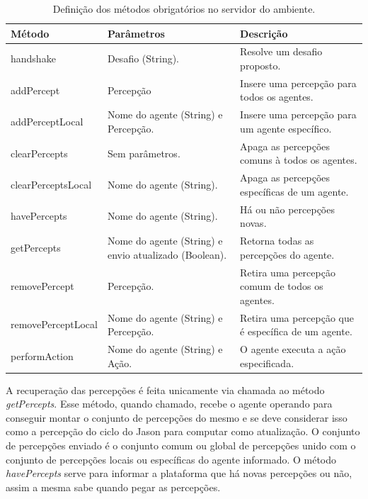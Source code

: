 \begin{table}
	\caption{Definição dos métodos obrigatórios no servidor do ambiente.}
	\label{table-server-environment}
	\begin{center}
	\begin{tabular}{|p{34mm}|p{50mm}|p{50mm}|} %
		\hline
		Método & Parâmetros & Descrição \\ \hline
		handshake & Desafio (String). & Resolve um desafio proposto. \\ \hline
		addPercept & Percepção & Insere uma percepção para todos os agentes.\\ \hline
		addPerceptLocal & Nome do agente (String) e Percepção. & Insere uma percepção para um agente específico. \\ \hline
		clearPercepts & Sem parâmetros. & Apaga as percepções comuns à todos os agentes.\\ \hline
		clearPerceptsLocal & Nome do agente (String). & Apaga as percepções específicas de um agente.\\ \hline
		havePercepts & Nome do agente (String). & Há ou não percepções novas. \\ \hline
		getPercepts &  Nome do agente (String) e envio atualizado (Boolean). & Retorna todas as percepções do agente. \\ \hline
		removePercept & Percepção. & Retira uma percepção comum de todos os agentes. \\ \hline
		removePerceptLocal & Nome do agente (String) e Percepção. & Retira uma percepção que é específica de um agente. \\ \hline
		performAction & Nome do agente (String) e Ação. & O agente executa a ação especificada. \\ \hline
	\end{tabular}
	\end{center}
\end{table}

A recuperação das percepções é feita unicamente via chamada ao método
\emph{getPercepts}. Esse método, quando chamado, recebe o agente operando para
conseguir montar o conjunto de percepções do mesmo e se deve considerar
isso como a percepção do ciclo do Jason para computar como atualização. O
conjunto de percepções enviado é o conjunto comum ou global de percepções
unido com o conjunto de percepções locais ou específicas do agente informado.
O método \emph{havePercepts} serve para informar a plataforma que há novas
percepções ou não, assim a mesma sabe quando pegar as percepções.

